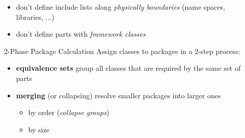 \documentclass[final]{beamer}
\newlength{\sepwid}
\newlength{\onecolwid}
\newlength{\twocolwid}
\begin{document}
\begin{frame}[t]
\begin{columns}[t]


    \begin{column}{\sepwid}\end{column}			%

    \begin{column}{\twocolwid}  %
    \begin{columns}[t,totalwidth=\twocolwid] %
    \begin{column}{\onecolwid}
      \begin{block}{}
        \begin{itemize}
          \item don't define include lists along \textit{physically boundaries} (name
            spaces, libraries, ...)
          \item don't define parts with \textit{framework classes}
        \end{itemize}
      \end{block}

      \begin{block}{2-Phase Package Calculation}
        Assign classes to packages in a 2-step process:
        \begin{itemize}
          \item \textbf{equivalence sets} group all classes that are required by the
            same set of parts
          \item \textbf{merging} (or collapsing) resolve smaller packages into
            larger ones
            \begin{itemize}
              \item by order (\textit{collapse groups})
              \item by size
            \end{itemize}
        \end{itemize}
      \end{block}
    \end{column}


\end{columns}
\end{column}
\end{columns}
\end{frame}
\end{document}
